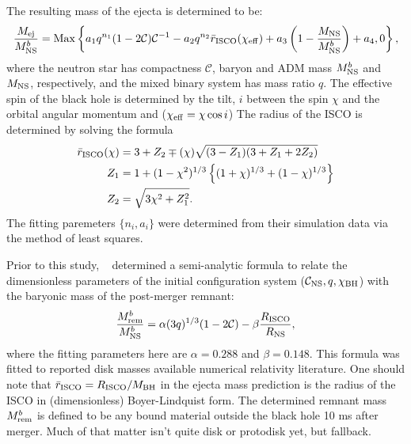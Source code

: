The resulting mass of the ejecta is determined to be:
\begin{align}
\label{e:mass_ejecta}
\frac{M_{\rm ej}}{M^b_{\rm NS}} = 
{\rm Max} 
\left \{ 
a_1 q^{n_1} (1- 2 \mathcal{C})\mathcal{C}^{-1}
-a_2 q^{n_2} \bar{r}_{\rm ISCO}(\chi_{\rm eff} )
+a_3 \left( 1- \frac{M_{\rm NS}}{M^b_{\rm NS}} \right)
+a_4
,
0
\right \},
\end{align}
where the neutron star has compactness $\mathcal{C}$, baryon and ADM mass $M^b_{\rm NS}$ and $M_{\rm NS}$, respectively, and the mixed binary system has mass ratio $q$.
The effective spin of the black hole is determined by the tilt, $i$ between the spin $\chi$ and the orbital angular momentum and ($\chi_{\rm eff} = \chi \cos i$)
The radius of the ISCO is determined by solving the formula
\begin{align}
\label{e:isco_r}
\bar{r}_{\rm ISCO}(\chi) &=
3+Z_2
\mp (\chi)
\sqrt{(3 - Z_1) (3 + Z_1 + 2 Z_2)} \\
\label{e:isco_z1}
Z_1 &= 
1 + (1 - \chi^2)^{1/3}
\left \{ 
(1 + \chi)^{1/3} + (1 - \chi)^{1/3}
\right \}  \\
\label{e:isco_z2}
Z_2 &= \sqrt{3 \chi^2 + Z_1^2}.
\end{align}
The fitting paremeters $\{n_i,a_i\}$ were determined from their simulation data via the method of least squares.

Prior to this study, ~\cite{Foucart2012} determined a semi-analytic formula to relate the dimensionless parameters of the initial configuration system ($\mathcal{C}_{\rm NS}, q, \chi_{\rm BH} $) with the baryonic mass of the post-merger remnant:
\begin{align}
\label{e:mass_disk}
\frac{M^b_{\rm rem}}{M^b_{\rm NS}} = 
\alpha (3 q)^{1/3} (1 - 2 \mathcal{C} )
-\beta  \frac{R_{\rm ISCO}}{R_{\rm NS}},
\end{align}
where the fitting parameters here are $\alpha = 0.288$ and $\beta = 0.148$.
This formula was fitted to reported disk masses available numerical relativity literature.
One should note that $\bar{r}_{\rm ISCO} = R_{\rm ISCO}/M_{\rm BH}$ in the ejecta mass prediction is the radius of the ISCO in (dimensionless)  Boyer-Lindquist form.
The determined remnant mass $M^b_{\rm rem}$ is defined to be any bound material outside the black hole 10 ms after merger.  
Much of that matter isn't quite disk or protodisk yet, but fallback.

